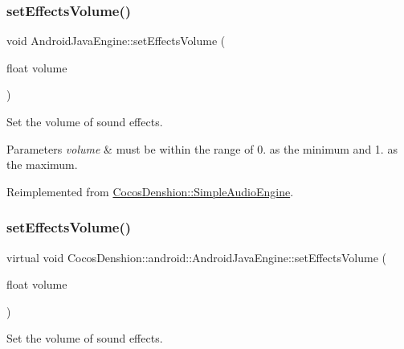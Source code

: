 \subsubsection{\texorpdfstring{set\+Effects\+Volume()}{setEffectsVolume()}\hspace{0.1cm}{\footnotesize\ttfamily [1/2]}}
{\footnotesize\ttfamily void Android\+Java\+Engine\+::set\+Effects\+Volume (\begin{DoxyParamCaption}\item[{float}]{volume }\end{DoxyParamCaption})\hspace{0.3cm}{\ttfamily [virtual]}}

Set the volume of sound effects.


\begin{DoxyParams}{Parameters}
{\em volume} & must be within the range of 0. as the minimum and 1. as the maximum. \\
\hline
\end{DoxyParams}


Reimplemented from \hyperlink{classCocosDenshion_1_1SimpleAudioEngine_a792bcbbf7da23ef90e38aaee576914e7}{Cocos\+Denshion\+::\+Simple\+Audio\+Engine}.

\mbox{\label{classCocosDenshion_1_1android_1_1AndroidJavaEngine_a45995fa6c9d77a9da8c2b389a9d938bd}} 
\subsubsection{\texorpdfstring{set\+Effects\+Volume()}{setEffectsVolume()}\hspace{0.1cm}{\footnotesize\ttfamily [2/2]}}
{\footnotesize\ttfamily virtual void Cocos\+Denshion\+::android\+::\+Android\+Java\+Engine\+::set\+Effects\+Volume (\begin{DoxyParamCaption}\item[{float}]{volume }\end{DoxyParamCaption})\hspace{0.3cm}{\ttfamily [virtual]}}

Set the volume of sound effects.


